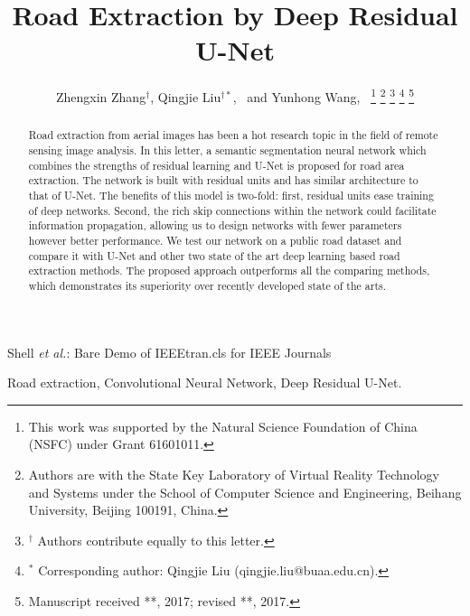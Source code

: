 \documentclass[journal]{IEEEtran}
\begin{document}
\title{Road Extraction by Deep Residual U-Net}

\author{Zhengxin Zhang$^{\dagger}$, %
	Qingjie Liu$^{\dagger *}$,~
	and Yunhong Wang,~
\thanks{This work was supported by the Natural Science Foundation of China (NSFC) under Grant 61601011.}
\thanks{Authors are with the State Key Laboratory of Virtual Reality Technology and Systems under the School of Computer Science and Engineering, Beihang University, Beijing 100191, China.}
\thanks{$^{\dagger}$ Authors contribute equally to this letter. }
\thanks{$^{*}$ Corresponding author: Qingjie Liu (qingjie.liu@buaa.edu.cn).}
\thanks{Manuscript received **, 2017; revised **, 2017.}
}




%
{Shell \MakeLowercase{\textit{et al.}}: Bare Demo of IEEEtran.cls for IEEE Journals}











\maketitle

\begin{abstract}
Road extraction from aerial images has been a hot research topic in the field of remote sensing image analysis. In this letter, a semantic segmentation neural network which combines the strengths of residual learning and U-Net is proposed for road area extraction. The network is built with residual units and has similar architecture to that of U-Net. The benefits of this model is two-fold: first, residual units ease  training of deep networks. Second, the rich skip connections within the network could facilitate information propagation, allowing us to design networks with fewer parameters however better performance. We test our network on a public road dataset and compare it with U-Net and other two state of the art deep learning based road extraction methods. The proposed approach outperforms all the comparing methods, which demonstrates its superiority over recently developed state of the arts. 
\end{abstract}

\begin{IEEEkeywords}
Road extraction, Convolutional Neural Network, Deep Residual U-Net.
\end{IEEEkeywords}
\end{document}
